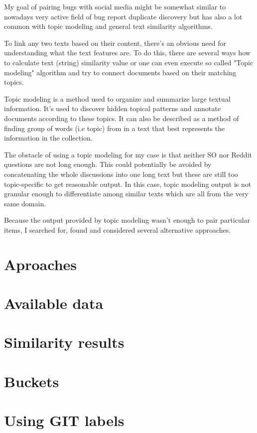 My goal of pairing bugs with social media might be somewhat similar to nowadays very active field of bug report duplicate discovery but has also a lot common with topic modeling and general text similarity algorithms.

To link any two texts based on their content, there's an obvious need for understanding what the text features are. 
To do this, there are several ways how to calculate text (string) similarity value or one can even execute so called "Topic modeling" algorithm and try to connect documents based on their matching topics.

Topic modeling is a method used to organize and summarize large textual information. It's used to discover hidden topical patterns and annotate documents according to these topics. It can also be described as a method of finding group of words (i.e topic) from in a text that best represents the information in the collection.

The obstacle of using a topic modeling for my case is that neither SO nor Reddit questions are not long enough. This could potentially be avoided by concatenating the whole discussions into one long text but these are still too topic-specific to get reasonable output. In this case, topic modeling output is not granular enough to differentiate among similar texts which are all from the very same domain. 

Because the output provided by topic modeling wasn't enough to pair particular items, I searched for, found and considered several alternative approaches.

\section{Aproaches}


\section{Available data}


\section{Similarity results}


\section{Buckets}



\section{Using GIT labels}

